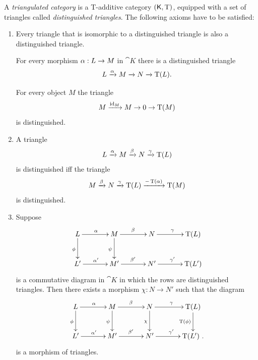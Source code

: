 \begin{dfn} \label{dfn:1158} 
A {\em triangulated category}
is a T-additive category
$(\operatorname{\mathsf{K}}, \operatorname{T})$, \lb equipped with a set of triangles called  {\em 
distinguished triangles}. 
The following axioms have to be satisfied:
\begin{enumerate}[leftmargin=30pt]
\item[(TR1)] 
\begin{itemize}
 Every triangle that is isomorphic to a distinguished
triangle is also a distinguished triangle. 

 For every morphism $\alpha : L \to M$ in $\cat{K}$ there is a
distinguished triangle 
\[ L \xrightarrow{\alpha} M \xrightarrow{} N \xrightarrow{} \operatorname{T}(L) . \] 

  For every object $M$ the triangle 
\[ M \xrightarrow{\operatorname{id}_M} M \to 0 \to \operatorname{T}(M) \] 
is distinguished.
\end{itemize}

\item[(TR2)] A triangle 
\[ L \xrightarrow{\alpha} M \xrightarrow{\beta} N \xrightarrow{\gamma} \operatorname{T}(L) \]
is distinguished iff the triangle 
\[ M \xrightarrow{\beta} N \xrightarrow{\gamma} \operatorname{T}(L) \xrightarrow{- \operatorname{T}(\alpha)} \operatorname{T}(M) \] 
is distinguished.

\item[(TR3)]  Suppose 
\[ \UseTips  \xymatrix @C=8ex @R=6ex { 
L 
\ar[r]^{\al}
\ar[d]_{\phi}
&
M
\ar[r]^{\be}
\ar[d]_{\psi}
& 
N
\ar[r]^{\ga}
&
\opn{T}(L)
\\
L' 
\ar[r]^{\al'}
&
M'
\ar[r]^{\be'}
& 
N'
\ar[r]^{\ga'}
&
\opn{T}(L') 
} \]
is a commutative diagram in $\cat{K}$ in which the rows are distinguished 
triangles. 
Then there exists a morphism $\chi : N \to N'$ such that the diagram
\[ \UseTips  \xymatrix @C=8ex @R=6ex { 
L 
\ar[r]^{\al}
\ar[d]_{\phi}
&
M
\ar[r]^{\be}
\ar[d]_{\psi}
& 
N
\ar[r]^{\ga}
\ar[d]_{\chi}
&
\opn{T}(L)
\ar[d]_{\opn{T}(\phi)}
\\
L' 
\ar[r]^{\al'}
&
M'
\ar[r]^{\be'}
& 
N'
\ar[r]^{\ga'}
&
\opn{T}(L') \ .
} \]
is a morphism of triangles.


\end{enumerate}
\end{dfn}
